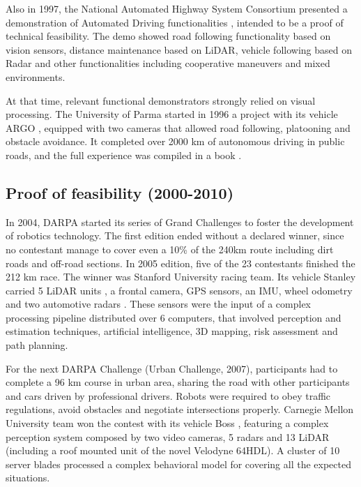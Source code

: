 Also in 1997, the National Automated Highway System Consortium presented a 
demonstration of Automated Driving functionalities \cite{Thorpe1997}, intended 
to be a proof of technical feasibility. 
The demo showed road following functionality based on vision sensors, distance 
maintenance based on LiDAR, vehicle following based on Radar and other 
functionalities including cooperative maneuvers and mixed environments.

At that time, relevant functional demonstrators strongly relied on visual 
processing. The University of Parma started in 1996 a project with its vehicle 
ARGO \cite{Broggi1998}, equipped with two cameras that allowed road following,
platooning and obstacle avoidance.
It completed over 2000 km of autonomous driving in public roads, and the full 
experience was compiled in a book \cite{Broggi1999}.

\subsection{Proof of feasibility (2000-2010)}

In 2004, DARPA started its series of Grand Challenges to foster the development
of robotics technology. 
The first edition ended without a declared winner, since no contestant manage to
cover even a 10\% of the 240km route including dirt roads and off-road sections.
In 2005 edition, five of the 23 contestants finished the 212 km race. 
The winner was Stanford University racing team. Its vehicle Stanley carried 5 
LiDAR units 
, a frontal camera, GPS sensors, an IMU, wheel odometry and two 
automotive radars \cite{Thrun2006}. These sensors were the input of a 
complex processing pipeline distributed over 6 computers, that involved
perception and estimation techniques, artificial intelligence, 3D mapping, 
risk assessment and path planning.

For the next DARPA Challenge (Urban Challenge, 2007), participants had to
complete a 96 km course in urban area, sharing the road 
with other participants and cars driven by professional drivers. Robots were 
required to obey traffic regulations, avoid obstacles and negotiate 
intersections properly. Carnegie Mellon University team won the contest with 
its vehicle Boss \cite{TartanRacing2005}, featuring a complex perception
system composed by two video cameras, 5 
radars and 13 LiDAR (including a roof mounted unit of the novel Velodyne 64HDL).
A cluster of 10 server blades processed a complex behavioral model
\cite{Urmson2007} for covering all the expected situations.


